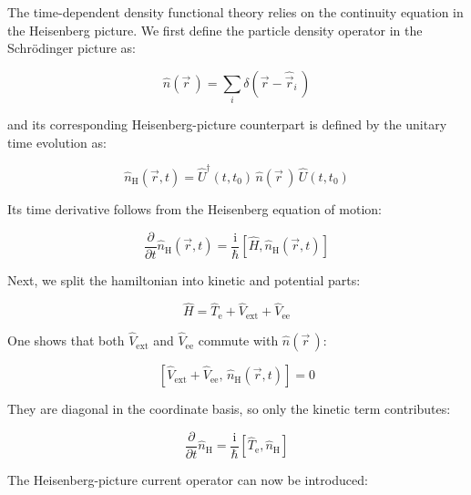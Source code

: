 The time-dependent density functional theory relies on the continuity equation in the Heisenberg picture.
We first define the particle density operator in the Schrödinger picture as:

\begin{equation}
    \hat{n}(\vec{r}\,)
    = \sum_i \delta(\vec{r}-\hat{\vec{r}}_i\,)
\label{Schrodinger-picture_density_operator}
\end{equation}

and its corresponding Heisenberg-picture counterpart is defined by the unitary time evolution as:

\begin{equation}
    \hat{n}_\mathrm{H}(\vec{r},t)
    = \hat{U}^\dagger(t,t_0)\,\hat{n}(\vec{r}\,)\,\hat{U}(t,t_0)
\label{Heisenberg-picture_density_operator}
\end{equation}

Its time derivative follows from the Heisenberg equation of motion:

\begin{equation}
    \frac{\partial}{\partial t}\hat n_\mathrm{H}(\vec{r},t)
    = \frac{\mathrm{i}}{\hbar}\left[\hat{H},\hat n_\mathrm{H}(\vec{r},t)\right]
\label{density_time_derivative}
\end{equation}

Next, we split the hamiltonian into kinetic and potential parts:

\begin{equation}
    \hat{H} = \hat{T}_\mathrm{e} + \hat{V}_\mathrm{ext} + \hat{V}_\mathrm{ee}
\label{splitted_hamiltonian}
\end{equation}

One shows that both $\hat{V}_\mathrm{ext}$ and $\hat{V}_\mathrm{ee}$ commute with $\hat{n}(\vec{r}\,)$:

\begin{equation}
    \left[\hat{V}_\mathrm{ext}+\hat{V}_\mathrm{ee},\,\hat n_\mathrm{H}(\vec{r},t)\right] = 0
\label{commuting_potential_density}
\end{equation}

They are diagonal in the coordinate basis, so only the kinetic term contributes:

\begin{equation}
    \frac{\partial}{\partial t}\hat{n}_\mathrm{H}
    = \frac{\mathrm{i}}{\hbar}\left[\hat{T}_\mathrm{e},\hat{n}_\mathrm{H}\right]
\label{kinetic_term_contribution}
\end{equation}

The Heisenberg-picture current operator can now be introduced:

